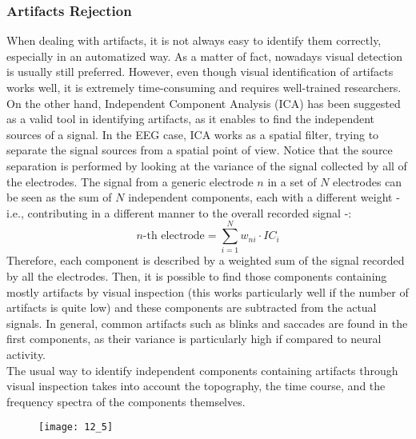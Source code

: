 \subsubsection{Artifacts Rejection}
When dealing with artifacts, it is not always easy to identify them correctly, especially in
an automatized way. As a matter of fact, nowadays visual detection is usually still preferred.
However, even though visual identification of artifacts works well, it is extremely time-consuming
and requires well-trained researchers.\\
On the other hand, Independent Component Analysis (ICA) has
been suggested as a valid tool in identifying artifacts, as it enables to find the
independent sources of a signal. In the EEG case, ICA works as a spatial filter, trying to
separate the signal sources from a spatial point of view. Notice that the source separation
is performed by looking at the variance of the signal collected by all of the electrodes.
The signal from a generic electrode \(n\) in a set of \(N\) electrodes can be seen as the
sum of \(N\) independent components, each with a different weight - i.e., contributing in a
different manner to the overall recorded signal -:
\begin{equation*}
    n\text{-th electrode} = \sum_{i=1}^N w_{ni}\cdot{IC_i}
\end{equation*}
Therefore, each component is described by a weighted sum of the signal recorded by all the
electrodes. Then, it is possible to find those components containing mostly artifacts by visual
inspection (this works particularly well if the number of artifacts is quite low) and these
components are subtracted from the actual signals. In general, common artifacts such as blinks
and saccades are found in the first components, as their variance is particularly high if
compared to neural activity.\\
The usual way to identify independent components containing artifacts through visual inspection
takes into account the topography, the time course, and the frequency spectra of the
components themselves.
\begin{figure}[H]
    \centering
    \texttt{[image: 12\_5]}
\end{figure}
